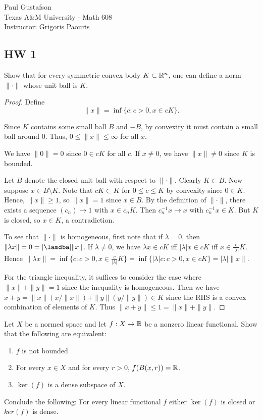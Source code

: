 \documentclass{article}
\begin{document}
\noindent Paul Gustafson\\
\noindent Texas A\&M University - Math 608 \\ 
\noindent Instructor: Grigoris Paouris

\subsection*{HW 1}
 Show that for every symmetric convex body $K \subset \mathbb{R}^n$, one can define a norm $\| \cdot \|$ whose unit ball is $K$.
\begin{proof}
Define $$\|x\| = \inf \{ c: c > 0, x \in cK \}.$$

Since $K$ contains some small ball $B$ and $-B$, by convexity it must contain a small ball around $0$.  Thus, $0 \le \|x\| \le \infty$ for all $x$.

We have $\|0\| =  0$ since $0 \in cK$ for all $c$.  If $x \neq 0$, we have $\|x\| \neq 0$ since $K$ is bounded.

Let $B$ denote the closed unit ball with respect to $\| \cdot \|$. Clearly $K \subset B$. Now suppose $x \in B \setminus K$.  Note that $cK \subset K$ for $0 \le c \le K$ by convexity since $0 \in K$. Hence, $\|x\| \ge 1$, so $\|x\| = 1$ since $x \in B$.  By the definition of $\|\cdot\|$, there exists a sequence $(c_n) \to 1$ with $x \in c_nK$. Then $c_n^{-1} x \to x$ with $c_n^{-1} x \in K$.  But $K$ is closed, so $x \in K$, a contradiction.

To see that $\| \cdot \|$ is homogeneous, first note that if $\lambda = 0$, then $\|\lambda x\| = 0 = |\lamdba| \|x\|$.  If $\lambda \neq 0$, we have $\lambda x \in cK$ iff $|\lambda|x \in cK$ iff $x \in \frac {c}{|\lambda|} K$. Hence $\|\lambda x\| = \inf \{ c: c > 0, x \in \frac{c}{|\lambda|}K \} = 
\inf \{ |\lambda| c: c > 0, x \in cK \} = |\lambda| \|x\|$.

For the triangle inequality, it suffices to consider the case where $\|x\| + \|y\| = 1$ since the inequality is homogeneous. Then we have
$x + y = \|x\| (x / \|x\|)  + \|y \| (y / \|y\|) \in K$ since the RHS is a convex combination of elements of $K$.  Thus $\|x + y\| \le 1 = \|x\| + \|y\|$.
\end{proof}

 Let $X$ be a normed space and let $f: X \to \mathbb{R}$ be a nonzero linear functional. Show that the following are equivalent:
\begin{enumerate}
\item $f$ is not bounded
\item For every $x \in X$ and for every $r > 0$, $f(B(x,r)) = \mathbb{R}$.
\item $\ker(f)$ is a dense subspace of $X$.
\end{enumerate}
Conclude the following: For every linear functional $f$ either $\ker(f)$ is closed or $ker(f)$ is dense.
\end{document}
